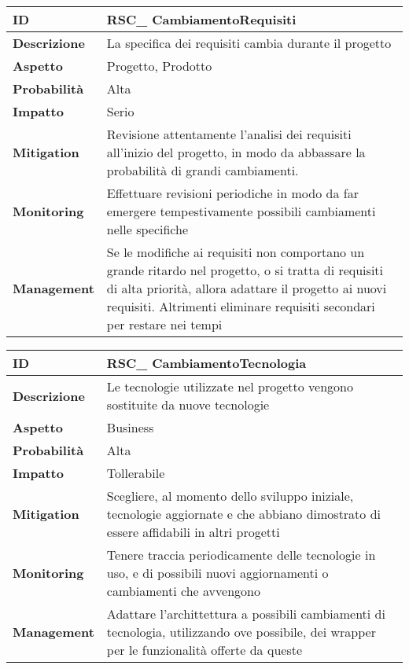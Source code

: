 \begin{tabular}{|p{2.2cm}|p{9.6cm}| }
 	\hline
	\textbf{ID} & RSC\_ CambiamentoRequisiti\\ [0.5ex] 
	\hline
	\textbf{Descrizione} & La specifica dei requisiti cambia durante il progetto \\ 
	\hline
	\textbf{Aspetto} &  Progetto, Prodotto\\
	\hline
	\textbf{Probabilità} &  Alta \\ 
	\hline
	\textbf{Impatto} &  Serio \\ 
	\hline
	\textbf{Mitigation} & Revisione attentamente l'analisi dei requisiti all'inizio del progetto, in modo da abbassare la probabilità di grandi cambiamenti.\\ 
	\hline
	\textbf{Monitoring} & Effettuare revisioni periodiche in modo da far emergere tempestivamente possibili cambiamenti nelle specifiche\\ 
	\hline
	\textbf{Management} & Se le modifiche ai requisiti non comportano un grande ritardo nel progetto, o si tratta di requisiti di alta priorità, allora adattare il progetto ai nuovi requisiti. Altrimenti eliminare requisiti secondari per restare nei tempi \\ 
	\hline
\end{tabular}

\begin{tabular}{|p{2.2cm}|p{9.6cm}| }
	\hline
   \textbf{ID} & RSC\_ CambiamentoTecnologia\\ [0.5ex] 
   \hline
   \textbf{Descrizione} & Le tecnologie utilizzate nel progetto vengono sostituite da nuove tecnologie  \\ 
   \hline
   \textbf{Aspetto} &  Business \\
   \hline
   \textbf{Probabilità} & Alta\\ 
   \hline
   \textbf{Impatto} & Tollerabile\\
   \hline
   \textbf{Mitigation} & Scegliere, al momento dello sviluppo iniziale, tecnologie aggiornate e che abbiano dimostrato di essere affidabili in altri progetti \\ 
   \hline
   \textbf{Monitoring} & Tenere traccia periodicamente delle tecnologie in uso, e di possibili nuovi aggiornamenti o cambiamenti che avvengono \\ 
   \hline
   \textbf{Management} & Adattare l'archittettura a possibili cambiamenti di tecnologia, utilizzando ove possibile, dei wrapper per le funzionalità offerte da queste \\ 
   \hline
\end{tabular}


